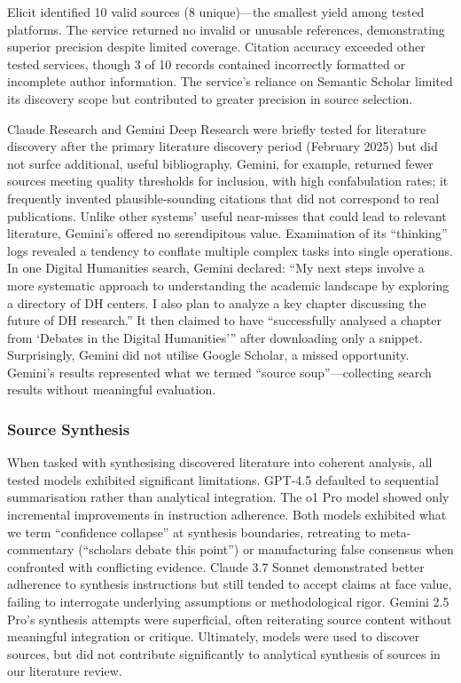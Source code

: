 Elicit identified 10 valid sources (8 unique)---the smallest yield among tested platforms. The service returned no invalid or unusable references, demonstrating superior precision despite limited coverage. Citation accuracy exceeded other tested services, though 3 of 10 records contained incorrectly formatted or incomplete author information. The service's reliance on Semantic Scholar limited its discovery scope but contributed to greater precision in source selection.

Claude Research and Gemini Deep Research were briefly tested for literature discovery after the primary literature discovery period (February 2025) but did not surfce additional, useful bibliography. Gemini, for example, returned fewer sources meeting quality thresholds for inclusion, with high confabulation rates; it frequently invented plausible-sounding citations that did not correspond to real publications. Unlike other systems' useful near-misses that could lead to relevant literature, Gemini's offered no serendipitous value. Examination of its ``thinking'' logs revealed a tendency to conflate multiple complex tasks into single operations. In one Digital Humanities search, Gemini declared: ``My next steps involve a more systematic approach to understanding the academic landscape by exploring a directory of DH centers. I also plan to analyze a key chapter discussing the future of DH research.'' It then claimed to have ``successfully analysed a chapter from `Debates in the Digital Humanities''' after downloading only a snippet. Surprisingly, Gemini did not utilise Google Scholar, a missed opportunity. Gemini's results represented what we termed ``source soup''---collecting search results without meaningful evaluation.

\subsubsection{Source Synthesis}

When tasked with synthesising discovered literature into coherent analysis, all tested models exhibited significant limitations. GPT-4.5 defaulted to sequential summarisation rather than analytical integration. The o1 Pro model showed only incremental improvements in instruction adherence. Both models exhibited what we term ``confidence collapse'' at synthesis boundaries, retreating to meta-commentary (``scholars debate this point'') or manufacturing false consensus when confronted with conflicting evidence. Claude 3.7 Sonnet demonstrated better adherence to synthesis instructions but still tended to accept claims at face value, failing to interrogate underlying assumptions or methodological rigor. Gemini 2.5 Pro's synthesis attempts were superficial, often reiterating source content without meaningful integration or critique. Ultimately, models were used to discover sources, but did not contribute significantly to analytical synthesis of sources in our literature review.


